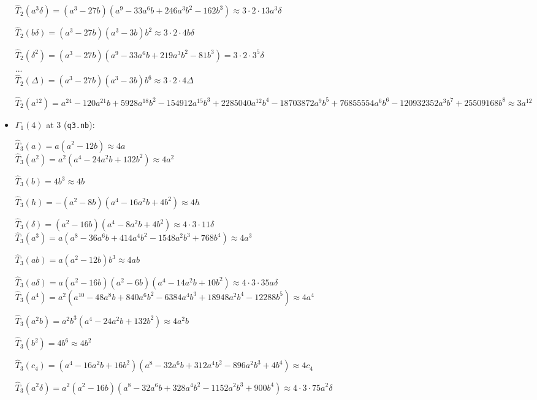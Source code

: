 \documentclass{rs}
\theoremstyle{definition}
\theoremstyle{remark}
\renewcommand{\D}{\Delta}
\renewcommand{\d}{\delta}
\newcommand{\G}{\Gamma}
\newcommand{\Ht}{\widehat{T}}
\renewcommand{\=}{\approx}
\renewcommand{\-}{\sim}
\numberwithin{equation}{section}
\numberwithin{thm}{section}
\begin{document}
\begin{itemize}
 $\Ht_2(a^3 \d) = (a^3 - 27 b) (a^9 - 33 a^6 b + 246 a^3 b^2 - 162 b^3) \= 3 \cdot 2 \cdot 13 a^3 \d$ 

 $\Ht_2(b \d) = (a^3 - 27 b) (a^3 - 3 b) b^2 \= 3 \cdot 2 \cdot 4 b \d$ 

 $\Ht_2(\d^2) = (a^3 - 27 b) (a^9 - 33 a^6 b + 219 a^3 b^2 - 81 b^3) = 3 \cdot 2 \cdot 3^5 \d$ \\

 ... \\

 $\Ht_2(\D) = (a^3 - 27 b) (a^3 - 3 b) b^6 \= 3 \cdot 2 \cdot 4 \D$ 

 $\Ht_2(a^{12}) = a^{24} - 120 a^{21} b + 5928 a^{18} b^2 - 154912 a^{15} b^3 + 
 2285040 a^{12} b^4 - 18703872 a^9 b^5 + 76855554 a^6 b^6 - 
 120932352 a^3 b^7 + 25509168 b^8 \= 3 a^{12}$ \\

 \item $\G_1(4)$ at 3 (\texttt{q3.nb}): 

 $\Ht_3(a) = a (a^2 - 12 b) \= 4 a$ \\

 $\Ht_3(a^2) = a^2 (a^4 - 24 a^2 b + 132 b^2) \= 4 a^2$ 

 $\Ht_3(b) = 4 b^3 \= 4 b$ 

 $\Ht_3(h) = -(a^2 - 8 b) (a^4 - 16 a^2 b + 4 b^2) \= 4 h$ 

 $\Ht_3(\d) = (a^2 - 16 b) (a^4 - 8 a^2 b + 4 b^2) \= 4 \cdot 3 \cdot 11 \d$ \\

 $\Ht_3(a^3) = a (a^8 - 36 a^6 b + 414 a^4 b^2 - 1548 a^2 b^3 + 768 b^4) \= 4 a^3$ 

 $\Ht_3(a b) = a (a^2 - 12 b) b^3 \= 4 a b$ 

 $\Ht_3(a \d) = a (a^2 - 16 b) (a^2 - 6 b) (a^4 - 14 a^2 b + 10 b^2) \= 4 \cdot 3 \cdot 35 a \d$ \\

 $\Ht_3(a^4) = a^2 (a^{10} - 48 a^8 b + 840 a^6 b^2 - 6384 a^4 b^3 + 18948 a^2 b^4 - 12288 b^5) \= 4 a^4$ 

 $\Ht_3(a^2 b) = a^2 b^3 (a^4 - 24 a^2 b + 132 b^2) \= 4 a^2 b$ 

 $\Ht_3(b^2) = 4 b^6 \= 4 b^2$ 

 $\Ht_3(c_4) = (a^4 - 16 a^2 b + 16 b^2) (a^8 - 32 a^6 b + 312 a^4 b^2 - 896 a^2 b^3 + 4 b^4) \= 4 c_4$ 

 $\Ht_3(a^2 \d) = a^2 (a^2 - 16 b) (a^8 - 32 a^6 b + 328 a^4 b^2 - 1152 a^2 b^3 + 
   900 b^4) \= 4 \cdot 3 \cdot 75 a^2 \d$ 


\end{itemize}
\end{document}
